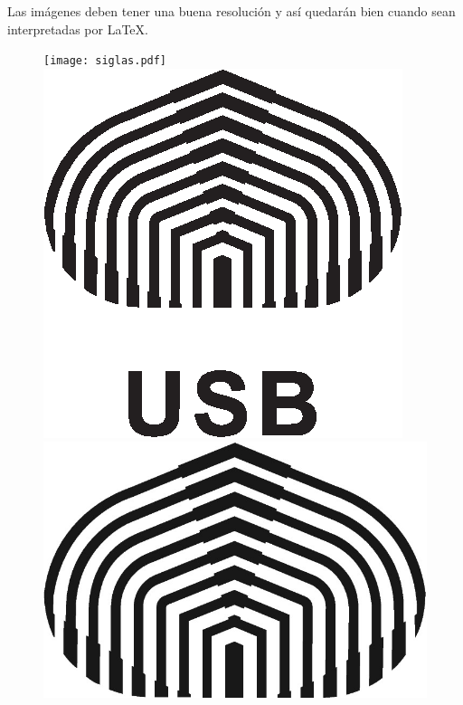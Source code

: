\documentclass{cgusb}
\numberwithin{equation}{section} %
\begin{document}
Las imágenes deben tener una buena resolución y así quedarán bien cuando
sean interpretadas por \LaTeX.

\begin{figure}[tcb]
  \centering
  \mbox{} \hfill
  \ifpdf
    \texttt{[image: siglas.pdf]}
  \else
    \includegraphics{siglas.eps}
  \fi
  \hfill
  \ifpdf
    \includegraphics{logo.jpg}

\end{figure}
\end{document}
